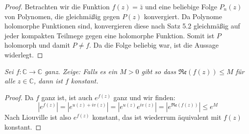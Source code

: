 \documentclass[11pt]{article}
\newcommand{\C}{\mathbb{C}}
\renewcommand{\Re}{\mathfrak{Re}}
\newenvironment{problem}[2][Beispiel]{
    \begin{trivlist}
        \item[\hskip \labelsep {\bfseries #1}\hskip \labelsep {\bfseries #2.}] \itshape}{
    \end{trivlist}\normalshape
}
\begin{document}
    \begin{proof}
        Betrachten wir die Funktion $f(z) = \bar{z}$ und eine beliebige Folge $P_n(z)$ von Polynomen, die
        gleichmäßig gegen $P(z)$ konvergiert. Da Polynome holomorphe Funktionen sind, konvergieren
        diese nach Satz 5.2 gleichmäßig auf jeder kompakten Teilmege gegen eine holomorphe Funktion.
        Somit ist $P$ holomorph und damit $P\neq f$. Da die Folge beliebig war, ist die Aussage widerlegt.
    \end{proof}

    \begin{problem}{5}
        Sei $f:\C\to\C$ ganz. Zeige: Falls es ein $M>0$ gibt so dass $\Re(f(z))\leq M$ für alle $z\in\C$,
        dann ist $f$ konstant.
    \end{problem}

    \begin{proof}
        Da $f$ ganz ist, ist auch $e^{f(z)}$ ganz und wir finden:
        $$|e^{f(z)}| = |e^{u(z)+iv(z)}| = |e^{u(z)}e^{iv(z)}| = |e^{\Re(f(z))}|\leq e^M $$
        Nach Liouville ist also $e^{f(z)}$ konstant, das ist wiederrum äquivalent mit $f(z)$ konstant.
    \end{proof}
\end{document}
